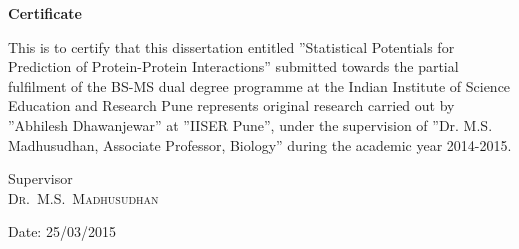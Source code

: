 \begin{titlepage}
\begin{center}
{\huge \bfseries Certificate}\\[2.5cm]
\end{center}
This is to certify that this dissertation entitled ''Statistical Potentials for Prediction of Protein-Protein Interactions'' submitted towards the partial fulfilment of the BS-MS dual degree programme at the Indian Institute of Science Education and Research Pune represents original research carried out by ''Abhilesh Dhawanjewar'' at ''IISER Pune'', under the supervision of ''Dr. M.S. Madhusudhan, Associate Professor, Biology'' during the academic year 2014-2015.\\[6cm]

\noindent
\begin{minipage}{.5\textwidth}
\begin{flushleft}
Supervisor\\
\textsc{\mbox{Dr. M.S. Madhusudhan}}
\end{flushleft}
\end{minipage}
\begin{minipage}{.5\textwidth}
\begin{flushright}
Date: 25/03/2015
\end{flushright}
\end{minipage}

\vfill %
\end{titlepage}

